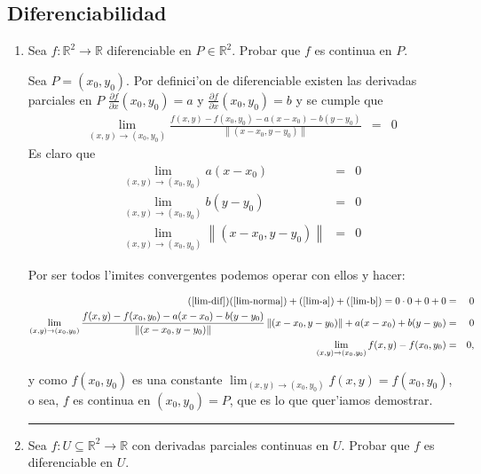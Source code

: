 \documentclass[a4paper,spanish]{article}
\newcommand{\R}[0]{\mathbb{R}}
\newcommand{\norma}[1]{\left\|#1\right\|}
\newcommand{\limite}[2]{\lim_{ #1 \rightarrow #2}}
\newcommand{\parcial}[2]{\frac{\partial #1}{\partial #2}}
\newenvironment{demo}{{\noindent \textbf{Demo: }}}{\hfill\rule{2mm}{2mm}\par}
\begin{document}
\subsection{Diferenciabilidad}

\begin{enumerate}

\item Sea $f : \R^2 \to \R$ diferenciable en $P \in \R^2$. Probar que $f$ es
continua en $P$.

\begin{demo}
Sea $P = (x_0,y_0)$. Por definici'on de diferenciable existen las derivadas
parciales en $P$ $\parcial{f}{x}(x_0,y_0) = a$ y $\parcial{f}{x}(x_0,y_0) = b$
y se cumple que
\begin{eqnarray}
\label {lim-dif}
\limite{(x,y)}{(x_0,y_0)} \frac{f(x,y) - f(x_0,y_0) - a(x-x_0) - b(y-y_0)}
                                 { \norma{(x-x_0,y-y_0)}} &=& 0
\end{eqnarray}
Es claro que
\begin{eqnarray}
\label{lim-a} \limite{(x,y)}{(x_0,y_0)} a(x-x_0) &=& 0 \\
\label{lim-b} \limite{(x,y)}{(x_0,y_0)} b(y-y_0) &=& 0 \\
\label{lim-norma}\limite{(x,y)}{(x_0,y_0)} \norma{(x-x_0,y-y_0)} &=& 0
\end{eqnarray}

Por ser todos l'imites convergentes podemos operar con ellos y hacer:
\begin{small}
\begin{eqnarray*}
(\ref{lim-dif}) (\ref{lim-norma}) + (\ref{lim-a}) + (\ref{lim-b}) = 
	0 \cdot 0 + 0 + 0 &=& 0 \\
\limite{(x,y)}{(x_0,y_0)} 
\frac{f(x,y) - f(x_0,y_0) - a(x-x_0) - b(y-y_0)}{ \norma{(x-x_0,y-y_0)}}
	\norma{(x-x_0,y-y_0)} + a(x-x_0) + b(y-y_0) &=& 0 \\
\limite{(x,y)}{(x_0,y_0)}  f(x,y) - f(x_0,y_0) &=& 0, \\
\end{eqnarray*}
\end{small}
y como $f(x_0,y_0)$ es una constante 
$\limite{(x,y)}{(x_0,y_0)} f(x,y) = f(x_0,y_0)$, o sea, $f$ es continua en
$(x_0,y_0) = P$, que es lo que quer'iamos demostrar.
\end{demo}

\item Sea $f : U \subseteq \R^2 \to \R$ con derivadas parciales continuas en 
$U$. Probar que $f$ es diferenciable en $U$.


\end{enumerate}
\end{document}
